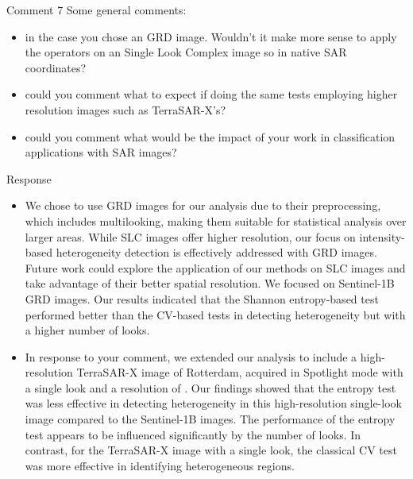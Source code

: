 \documentclass[11pt]{report}
\begin{document}
\vspace{3em}
\begin{reviewbox}{Comment 7}
Some general comments:
\begin{itemize}
	\item in the case you chose an GRD image. Wouldn't it make more sense to apply the operators on an Single Look Complex image so in native SAR coordinates?
	\item could you comment what to expect if doing the same tests employing higher resolution images such as TerraSAR-X's?
	\item could you comment what would be the impact of your work in classification applications with SAR images?
\end{itemize}
\end{reviewbox}

\begin{responsebox}{Response}
\begin{itemize}
 \item We chose to use GRD images for our analysis due to their preprocessing, which includes multilooking, making them suitable for statistical analysis over larger areas. While SLC images offer higher resolution, our focus on intensity-based heterogeneity detection is effectively addressed with GRD images. 
Future work could explore the application of our methods on SLC images and take advantage of their better spatial resolution.
We focused on Sentinel-1B GRD images. Our results indicated that the Shannon entropy-based test performed better than the CV-based tests in detecting heterogeneity but with a higher number of looks.

\item In response to your comment, we extended our analysis to include a high-resolution TerraSAR-X image of Rotterdam, acquired in Spotlight mode with a single look and a resolution of .
Our findings showed that the entropy test was less effective in detecting heterogeneity in this high-resolution single-look image compared to the Sentinel-1B images. 
The performance of the entropy test appears to be influenced significantly by the number of looks.
In contrast, for the TerraSAR-X image with a single look, the classical CV test was more effective in identifying heterogeneous regions.


\end{itemize}
\end{responsebox}
\end{document}
